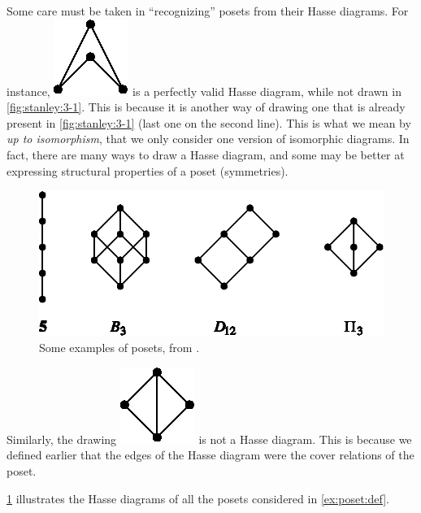 Some care must be taken in ``recognizing'' posets from their Hasse diagrams.
For instance, \includegraphics{fig/stanley/3-1:a} is a perfectly
valid Hasse diagram, while not drawn in \ref{fig:stanley:3-1}. This is because
it is another way of drawing one that is already present in
\ref{fig:stanley:3-1} (last one on the second line).
This is what we mean by \emph{up to isomorphism}, \ie that we only consider one
version of isomorphic diagrams. In fact, there are many ways to draw a Hasse
diagram, and some may be better at expressing structural properties of a poset
(\eg symmetries).


\begin{figure}
	\centering
	\includegraphics[height=0.2\textheight]{fig/stanley/3-2}
	\caption{\label{fig:stanley:3-2} Some examples of posets, from
\citet*{Stanley:2011:ECV:2124415}.}
\end{figure}


Similarly, the drawing \includegraphics{fig/stanley/3-1:b} is not a Hasse diagram.
This is because we defined earlier that the edges of
the Hasse diagram were the cover relations of the poset.


\ref{fig:stanley:3-2} illustrates the Hasse diagrams of all the posets
considered in \ref{ex:poset:def}.

